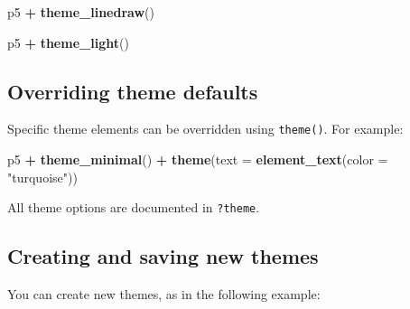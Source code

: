 \documentclass[]{book}
\newenvironment{Shaded}{\begin{snugshade}}{\end{snugshade}}
\newcommand{\KeywordTok}[1]{\textcolor[rgb]{0.13,0.29,0.53}{\textbf{#1}}}
\newcommand{\DataTypeTok}[1]{\textcolor[rgb]{0.13,0.29,0.53}{#1}}
\newcommand{\StringTok}[1]{\textcolor[rgb]{0.31,0.60,0.02}{#1}}
\newcommand{\OperatorTok}[1]{\textcolor[rgb]{0.81,0.36,0.00}{\textbf{#1}}}
\newcommand{\NormalTok}[1]{#1}
\begin{document}
\begin{Shaded}
\begin{Highlighting}[]
\NormalTok{p5 }\OperatorTok{+}\StringTok{ }\KeywordTok{theme_linedraw}\NormalTok{()}
\end{Highlighting}
\end{Shaded}

\begin{Shaded}
\begin{Highlighting}[]
\NormalTok{p5 }\OperatorTok{+}\StringTok{ }\KeywordTok{theme_light}\NormalTok{()}
\end{Highlighting}
\end{Shaded}

\subsection{Overriding theme defaults}\label{overriding-theme-defaults}

Specific theme elements can be overridden using \texttt{theme()}. For
example:

\begin{Shaded}
\begin{Highlighting}[]
\NormalTok{p5 }\OperatorTok{+}\StringTok{ }\KeywordTok{theme_minimal}\NormalTok{() }\OperatorTok{+}
\StringTok{  }\KeywordTok{theme}\NormalTok{(}\DataTypeTok{text =} \KeywordTok{element_text}\NormalTok{(}\DataTypeTok{color =} \StringTok{"turquoise"}\NormalTok{))}
\end{Highlighting}
\end{Shaded}

All theme options are documented in \texttt{?theme}.

\subsection{Creating and saving new
themes}\label{creating-and-saving-new-themes}

You can create new themes, as in the following example:
\end{document}

